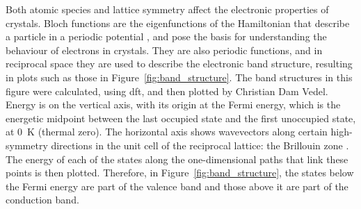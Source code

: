 Both atomic species and lattice symmetry affect the electronic properties of crystals. Bloch functions are the eigenfunctions of the Hamiltonian that describe a particle in a periodic potential \cite{Dirl2005}, and pose the basis for understanding the behaviour of electrons in crystals. They are also periodic functions, and in reciprocal space they are used to describe the electronic band structure, resulting in plots such as those in Figure~\ref{fig:band_structure}. The band structures in this figure were calculated, using \acf{dft}, and then plotted by Christian Dam Vedel. Energy is on the vertical axis, with its origin at the Fermi energy, which is the energetic midpoint between the last occupied state and the first unoccupied state, at \qty{0}{\kelvin} (thermal zero). The horizontal axis shows wavevectors along certain high-symmetry directions in the unit cell of the reciprocal lattice: the Brillouin zone \cite{Setyawan2010}. The energy of each of the states along the one-dimensional paths that link these points is then plotted. Therefore, in Figure~\ref{fig:band_structure}, the states below the Fermi energy are part of the valence band and those above it are part of the conduction band. 

